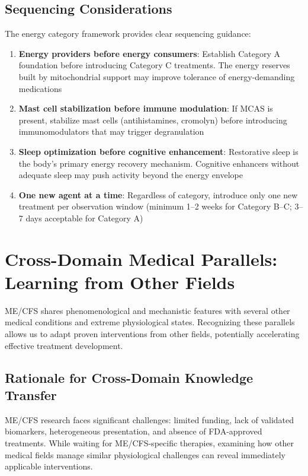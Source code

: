 \subsection{Sequencing Considerations}

The energy category framework provides clear sequencing guidance:

\begin{enumerate}
    \item \textbf{Energy providers before energy consumers}: Establish Category A foundation before introducing Category C treatments. The energy reserves built by mitochondrial support may improve tolerance of energy-demanding medications
    \item \textbf{Mast cell stabilization before immune modulation}: If MCAS is present, stabilize mast cells (antihistamines, cromolyn) before introducing immunomodulators that may trigger degranulation
    \item \textbf{Sleep optimization before cognitive enhancement}: Restorative sleep is the body's primary energy recovery mechanism. Cognitive enhancers without adequate sleep may push activity beyond the energy envelope
    \item \textbf{One new agent at a time}: Regardless of category, introduce only one new treatment per observation window (minimum 1--2 weeks for Category B--C; 3--7 days acceptable for Category A)
\end{enumerate}

\section{Cross-Domain Medical Parallels: Learning from Other Fields}
\label{sec:cross-domain-parallels}

ME/CFS shares phenomenological and mechanistic features with several other medical conditions and extreme physiological states. Recognizing these parallels allows us to adapt proven interventions from other fields, potentially accelerating effective treatment development.

\subsection{Rationale for Cross-Domain Knowledge Transfer}
\label{subsec:cross-domain-rationale}

ME/CFS research faces significant challenges: limited funding, lack of validated biomarkers, heterogeneous presentation, and absence of FDA-approved treatments. While waiting for ME/CFS-specific therapies, examining how other medical fields manage similar physiological challenges can reveal immediately applicable interventions.

